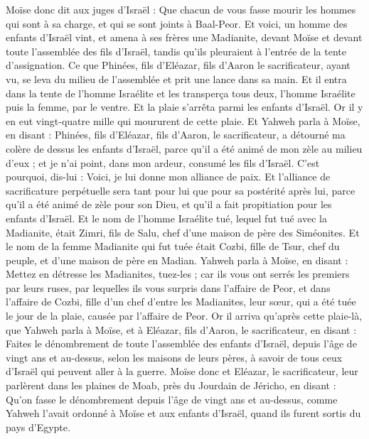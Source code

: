 \begin{multicols}{2}
Moïse donc dit aux juges d'Israël : Que chacun de vous fasse mourir les hommes qui sont à sa charge, et qui se sont joints à Baal-Peor.
Et voici, un homme des enfants d'Israël vint, et amena à ses frères une Madianite, devant Moïse et devant toute l'assemblée des fils d'Israël, tandis qu'ils pleuraient à l'entrée de la tente d'assignation.
Ce que Phinées, fils d'Eléazar, fils d'Aaron le sacrificateur, ayant vu, se leva du milieu de l'assemblée et prit une lance dans sa main.
Et il entra dans la tente de l'homme Israélite et les transperça tous deux, l'homme Israélite puis la femme, par le ventre. Et la plaie s'arrêta parmi les enfants d'Israël.
Or il y en eut vingt-quatre mille qui moururent de cette plaie.
Et Yahweh parla à Moïse, en disant :
Phinées, fils d'Eléazar, fils d'Aaron, le sacrificateur, a détourné ma colère de dessus les enfants d'Israël, parce qu'il a été animé de mon zèle au milieu d'eux ; et je n'ai point, dans mon ardeur, consumé les fils d'Israël.
C'est pourquoi, dis-lui : Voici, je lui donne mon alliance de paix.
Et l'alliance de sacrificature perpétuelle sera tant pour lui que pour sa postérité après lui, parce qu'il a été animé de zèle pour son Dieu, et qu'il a fait propitiation pour les enfants d'Israël.
Et le nom de l'homme Israélite tué, lequel fut tué avec la Madianite, était Zimri, fils de Salu, chef d'une maison de père des Siméonites.
Et le nom de la femme Madianite qui fut tuée était Cozbi, fille de Tsur, chef du peuple, et d'une maison de père en Madian.
Yahweh parla à Moïse, en disant :
Mettez en détresse les Madianites, tuez-les ;
car ils vous ont serrés les premiers par leurs ruses, par lequelles ils vous surpris dans l'affaire de Peor, et dans l'affaire de Cozbi, fille d'un chef d'entre les Madianites, leur sœur, qui a été tuée le jour de la plaie, causée par l'affaire de Peor.
\VerseOne{} Or il arriva qu'après cette plaie-là, que Yahweh parla à Moïse, et à Eléazar, fils d'Aaron, le sacrificateur, en disant :
Faites le dénombrement de toute l'assemblée des enfants d'Israël, depuis l'âge de vingt ans et au-dessus, selon les maisons de leurs pères, à savoir de tous ceux d'Israël qui peuvent aller à la guerre.
Moïse donc et Eléazar, le sacrificateur, leur parlèrent dans les plaines de Moab, près du Jourdain de Jéricho, en disant :
Qu'on fasse le dénombrement depuis l'âge de vingt ans et au-dessus, comme Yahweh l'avait ordonné à Moïse et aux enfants d'Israël, quand ils furent sortis du pays d'Egypte.

\end{multicols}
